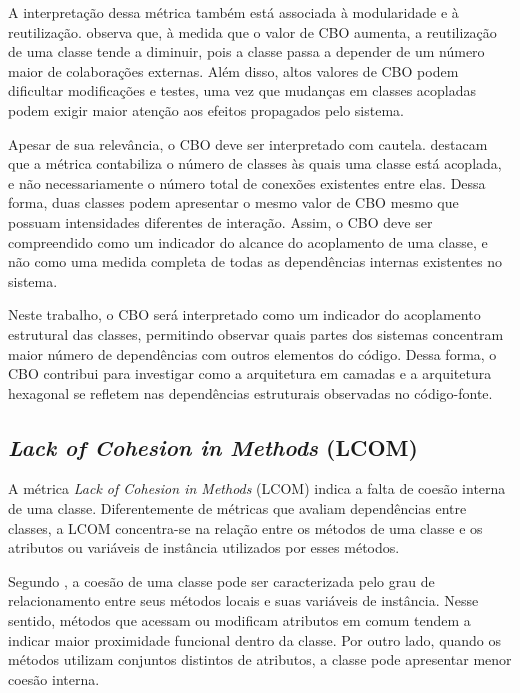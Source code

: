 A interpretação dessa métrica também está associada à modularidade e à reutilização.  observa que, 
à medida que o valor de CBO aumenta, a reutilização de uma classe tende a diminuir, pois a classe passa a depender de um número 
maior de colaborações externas. Além disso, altos valores de CBO podem dificultar modificações e testes, uma vez que mudanças 
em classes acopladas podem exigir maior atenção aos efeitos propagados pelo sistema.

Apesar de sua relevância, o CBO deve ser interpretado com cautela.  destacam que a métrica contabiliza o 
número de classes às quais uma classe está acoplada, e não necessariamente o número total de conexões existentes entre elas. 
Dessa forma, duas classes podem apresentar o mesmo valor de CBO mesmo que possuam intensidades diferentes de interação. Assim, 
o CBO deve ser compreendido como um indicador do alcance do acoplamento de uma classe, e não como uma medida completa de todas 
as dependências internas existentes no sistema.

Neste trabalho, o CBO será interpretado como um indicador do acoplamento estrutural das classes, permitindo observar quais partes
dos sistemas concentram maior número de dependências com outros elementos do código. Dessa forma, o CBO contribui para investigar 
como a arquitetura em camadas e a arquitetura hexagonal se refletem nas dependências estruturais observadas no código-fonte.

\subsection{\textit{Lack of Cohesion in Methods} (LCOM)}
\label{sec:lcom}

A métrica \textit{Lack of Cohesion in Methods} (LCOM) indica a falta de coesão interna de uma classe. 
Diferentemente de métricas que avaliam dependências entre classes, a LCOM concentra-se na relação entre os 
métodos de uma classe e os atributos ou variáveis de instância utilizados por esses métodos.

Segundo , a coesão de uma classe pode ser caracterizada pelo grau de relacionamento entre seus métodos locais 
e suas variáveis de instância. Nesse sentido, métodos que acessam ou modificam atributos em comum tendem a indicar maior proximidade 
funcional dentro da classe. Por outro lado, quando os métodos utilizam conjuntos distintos de atributos, a classe pode apresentar 
menor coesão interna.

